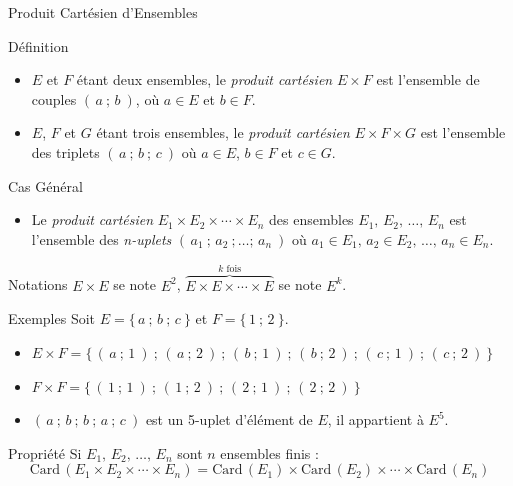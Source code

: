 \documentclass{coursbook}
\begin{document}
    \begin{Gpartie}{Produit Cartésien d'Ensembles}
        \begin{Spartie}{Définition}
            \begin{itemize}
                \item $E$ et $F$ étant deux ensembles, le \emph{produit cartésien} $E\times F$ est l'ensemble de couples $(\,a~;\,b~)$, où $a\in E$ et $b\in F$.
                \item $E$, $F$ et $G$ étant trois ensembles, le \emph{produit cartésien} $E\times F\times G$ est l'ensemble des triplets $(\,a~;\,b~;\,c~)$ où $a\in E$, $b\in F$ et $c\in G$.
            \end{itemize}
            \begin{SSpartie}{Cas Général}
                \begin{itemize}
                    \item Le \emph{produit cartésien} $E_1\times E_2\times\dotsb\times E_n$ des ensembles $E_1,\,E_2,\,\dotsc,\,E_n$ est l'ensemble des \emph{n-uplets} $(\,a_1~;\,a_2~;\dotsc;\,a_n~)$ où $a_1\in E_1,\,a_2\in E_2,\,\dotsc,\,a_n\in E_n$.
                \end{itemize}
            \end{SSpartie}
        \end{Spartie}
        \begin{Spartie}{Notations}
            $E\times E$ se note $E^2$, $\overbrace{E\times E\times\dotsb\times E}^\text{$k$ fois}$ se note $E^k$.
        \end{Spartie}
        \begin{Spartie}{Exemples}
            Soit $E=\big\{\,a~;\,b~;\,c~\big\}$ et $F=\big\{\,1~;\,2~\big\}$.
            \begin{itemize}
                \item $E\times F=\big\{\,(\,a~;\,1~)~;\,(\,a~;\,2~)~;\,(\,b~;\,1~)~;\,(\,b~;\,2~)~;\,(\,c~;\,1~)~;\,(\,c~;\,2~)~\big\}$
                \item $F\times F=\big\{\,(\,1~;\,1~)~;\,(\,1~;\,2~)~;\,(\,2~;\,1~)~;\,(\,2~;\,2~)~\big\}$
                \item $(\,a~;\,b~;\,b~;\,a~;\,c~)$ est un 5-uplet d'élément de $E$, il appartient à $E^5$.
            \end{itemize}
        \end{Spartie}
        \begin{Spartie}{Propriété}
            Si $E_1,\,E_2,\,\dotsc,\,E_n$ sont $n$ ensembles finis :
            \[\mathrm{Card}\,(E_1\times E_2\times\dotsb\times E_n)=\mathrm{Card}\,(E_1)\times\mathrm{Card}\,(E_2)\times\dotsb\times\mathrm{Card}\,(E_n)\]

\end{Spartie}
\end{Gpartie}
\end{document}
